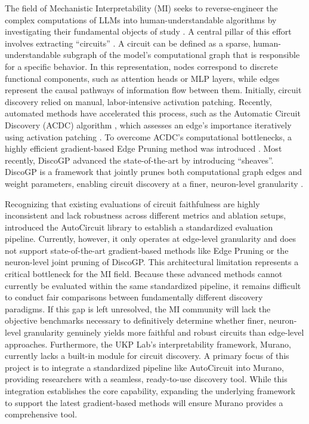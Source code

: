 \documentclass[
    IMRAD=false,
	english,
	ruledheaders=section, %
	class=report, %
	thesis={type=bachelor}, %
	accentcolor=9c, %
	custommargins=false,%
	marginpar=false,%
	parskip=half,%
	fontsize=11pt,%
]{tudapub}
\begin{document}
The field of Mechanistic Interpretability (MI) seeks to reverse-engineer the complex computations of LLMs into human-understandable algorithms by investigating their fundamental objects of study \citep{rai2025practicalreview}. A central pillar of this effort involves extracting ``circuits'' \citep{wang2023interpretability}. A circuit can be defined as a sparse, human-understandable subgraph of the model's computational graph that is responsible for a specific behavior. In this representation, nodes correspond to discrete functional components, such as attention heads or MLP layers, while edges represent the causal pathways of information flow between them. Initially, circuit discovery relied on manual, labor-intensive activation patching. Recently, automated methods have accelerated this process, such as the Automatic Circuit Discovery (ACDC) algorithm \citep{acdc}, which assesses an edge's importance iteratively using activation patching \citep{goldowskydill2023localizingmodelbehaviorpath}. To overcome ACDC's computational bottlenecks, a highly efficient gradient-based Edge Pruning method was introduced \citep{edgePruning}. Most recently, DiscoGP advanced the state-of-the-art by introducing ``sheaves''. DiscoGP is a framework that jointly prunes both computational graph edges and weight parameters, enabling circuit discovery at a finer, neuron-level granularity \citep{yu-etal-2025-sheaf}.

Recognizing that existing evaluations of circuit faithfulness are highly inconsistent and lack robustness across different metrics and ablation setups, \citet{miller2024transformer} introduced the AutoCircuit library to establish a standardized evaluation pipeline. Currently, however, it only operates at edge-level granularity and does not support state-of-the-art gradient-based methods like Edge Pruning or the neuron-level joint pruning of DiscoGP. This architectural limitation represents a critical bottleneck for the MI field. Because these advanced methods cannot currently be evaluated within the same standardized pipeline, it remains difficult to conduct fair comparisons between fundamentally different discovery paradigms. If this gap is left unresolved, the MI community will lack the objective benchmarks necessary to definitively determine whether finer, neuron-level granularity genuinely yields more faithful and robust circuits than edge-level approaches. Furthermore, the UKP Lab’s interpretability framework, Murano, currently lacks a built-in module for circuit discovery. A primary focus of this project is to integrate a standardized pipeline like AutoCircuit into Murano, providing researchers with a seamless, ready-to-use discovery tool. While this integration establishes the core capability, expanding the underlying framework to support the latest gradient-based methods will ensure Murano provides a comprehensive tool.
\end{document}
